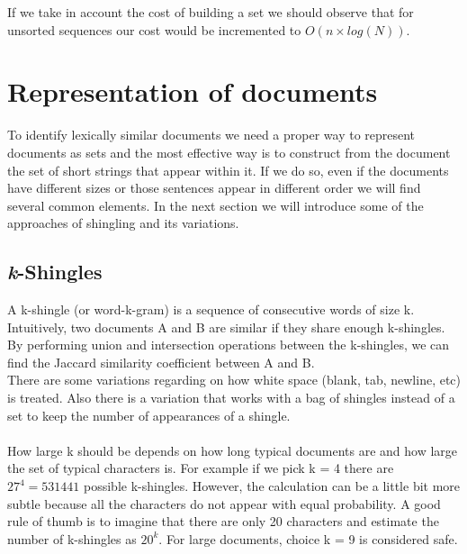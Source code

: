 \documentclass[12pt]{article}
\begin{document}
If we take in account the cost of building a set we should observe that for unsorted sequences our cost would be incremented to $O(n \times log(N))$.


\section{Representation of documents} \label{Representation}

To identify lexically similar documents we need a proper way to represent documents as sets and the most effective way is to construct from the document the set of short strings that appear within it. If we do so, even if the documents have different sizes or those sentences appear in different order we will find several common elements. In the next section we will introduce some of the approaches of shingling and its variations.

\subsection{\textit{k}-Shingles} \label{kShingles}

A k-shingle (or word-k-gram) is a sequence of consecutive words of size k. Intuitively, two documents A and B are similar if they share enough k-shingles. By performing union and intersection operations between the k-shingles, we can find the Jaccard similarity coefficient between A and B. 
\\
There are some variations regarding on how white space (blank, tab, newline, etc) is treated. Also there is a variation that works with a bag of shingles instead of a set to keep the number of appearances of a shingle. \medskip \\
\\
How large k should be depends on how long typical documents are and how large the set of typical characters is. For example if we pick k = 4 there are $27^4=531441 $ possible k-shingles. However, the calculation can be a little bit more subtle because all the characters do not appear with equal probability. A good rule of thumb is to imagine that there are only 20 characters and estimate the number of k-shingles as $20^k$. For large documents, choice k = 9 is considered safe. 
\end{document}

